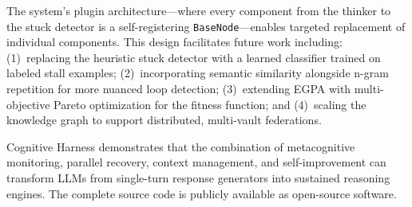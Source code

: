 \documentclass[conference]{IEEEtran}
\begin{document}
The system's plugin architecture---where every component from the thinker to the stuck detector is a self-registering \texttt{BaseNode}---enables targeted replacement of individual components. This design facilitates future work including: (1)~replacing the heuristic stuck detector with a learned classifier trained on labeled stall examples; (2)~incorporating semantic similarity alongside n-gram repetition for more nuanced loop detection; (3)~extending EGPA with multi-objective Pareto optimization for the fitness function; and (4)~scaling the knowledge graph to support distributed, multi-vault federations.

Cognitive Harness demonstrates that the combination of metacognitive monitoring, parallel recovery, context management, and self-improvement can transform LLMs from single-turn response generators into sustained reasoning engines. The complete source code is publicly available as open-source software.
\end{document}
